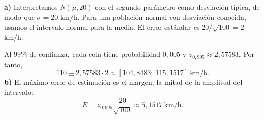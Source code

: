 \textbf{a)} Interpretamos $N(\mu,20)$ con el segundo parámetro como desviación típica, de modo que $\sigma=20$ km/h. Para una población normal con desviación conocida, usamos el intervalo normal para la media. El error estándar es $20/\sqrt{100}=2$ km/h.

Al $99\%$ de confianza, cada cola tiene probabilidad $0{,}005$ y $z_{0{,}995}\approx2{,}57583$. Por tanto,
\[
 110\pm2{,}57583\cdot2
 \approx\boxed{[104{,}8483;\ 115{,}1517]}\ \text{km/h}.
\]
\textbf{b)} El máximo error de estimación es el margen, la mitad de la amplitud del intervalo:
\[
 E=z_{0{,}995}\frac{20}{\sqrt{100}}
 \approx\boxed{5{,}1517}\ \text{km/h}.
\]
